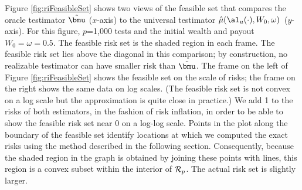 \documentclass[12pt]{article}
\newcommand{\uTest}{\mbox{$\hat\mu(\al_u(\cdot),W_0,\omega)$}}
\begin{document}
 Figure \ref{fig:riFeasibleSet} shows two views of the feasible set that
 compares the oracle testimator $\tilde{\bmu}$ ($x$-axis) to the universal
 testimator \uTest\ ($y$-axis).  For this figure, $p$=1,000 tests and the
 initial wealth and payout $W_0 = \omega = 0.5$.  The feasible risk set is the
 shaded region in each frame.  The feasible risk set lies above the diagonal in
 this comparison; by construction, no realizable testimator can have smaller
 risk than $\tilde{\bmu}$.  The frame on the left of Figure
 \ref{fig:riFeasibleSet} shows the feasible set on the scale of risks; the frame
 on the right shows the same data on log scales.  (The feasible risk set is not
 convex on a log scale but the approximation is quite close in practice.)  We
 add 1 to the risks of both estimators, in the fashion of risk inflation, in
 order to be able to show the feasible risk set near 0 on a log-log scale.
  Points in the plot along the boundary of the feasible set identify locations
 at which we computed the exact risks using the method described in the
 following section.  Consequently, because the shaded region in the graph is
 obtained by joining these points with lines, this region is a convex subset
 within the interior of ${\cal R}_p$.  The actual risk set is slightly larger.
\end{document}

